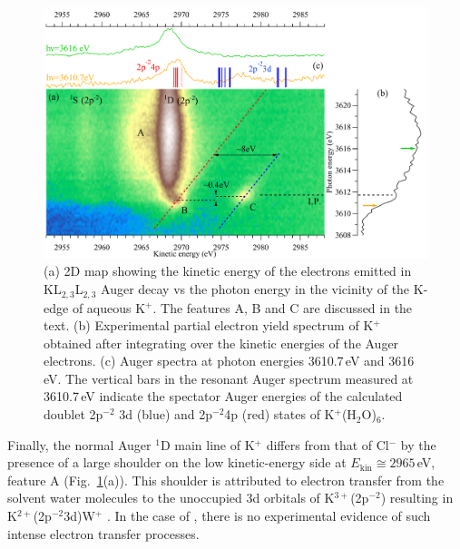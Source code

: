 \begin{figure}[h!]
\centering
\includegraphics[scale=0.55]{figures/k_2dmap.pdf}
\caption{(a) 2D map showing the kinetic energy of the electrons emitted in KL$_{2,3}$L$_{2,3}$ Auger decay vs the photon energy in the vicinity of the K-edge of aqueous K$^{+}$. The features A, B and C are discussed in the text.
(b) Experimental partial electron yield spectrum of K$^{+}$ obtained after integrating over the kinetic energies of the Auger electrons.
(c) Auger spectra at photon energies 3610.7\,eV and 3616\,eV. The vertical bars in the resonant Auger spectrum measured at 3610.7\,eV indicate the spectator Auger energies of the calculated doublet 2p$^{-2}$ 3d (blue) and 2p$^{-2}$4p (red) states of K$^{+}$(H$_2$O)$_6$.}
\label{fg:2dmap_k}
\end{figure}


Finally, the normal Auger $^1$D main line of K$^{+}$ differs from that of Cl$^{-}$ by the presence of a large shoulder on the low kinetic-energy side at $E_{\text{kin}} \cong 2965$\,eV, feature A (Fig.\ \ref{fg:2dmap_k}(a)). This shoulder is attributed to electron transfer from the solvent water molecules to the unoccupied 3d orbitals of K$^{3+}$(2p$^{-2}$) resulting in K$^{2+}$(2p$^{-2}$3d)W$^{+}$ \citep{ceolin17:263003}. In the case of \cli, there is no experimental evidence of such intense electron transfer processes.


